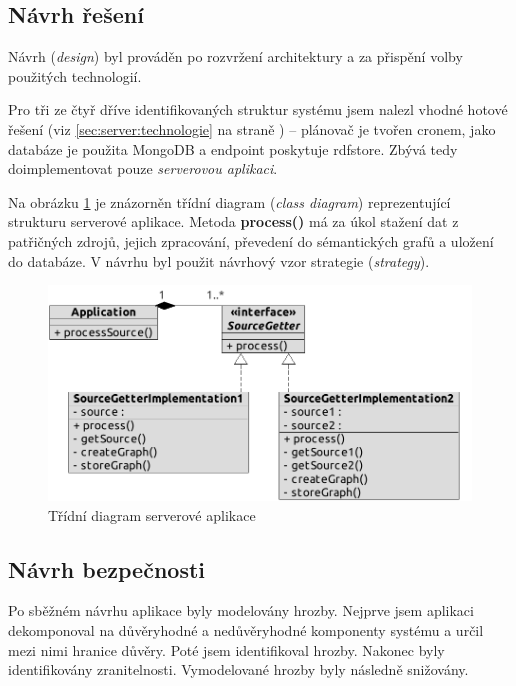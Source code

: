 \subsection{Návrh řešení}
Návrh (\textit{design}) byl prováděn po rozvržení architektury a za přispění volby použitých technologií.

Pro tři ze čtyř dříve identifikovaných struktur systému jsem nalezl vhodné hotové řešení (viz \ref{sec:server:technologie} na straně \pageref{sec:server:technologie}) -- plánovač je tvořen cronem, jako databáze je použita MongoDB a  endpoint poskytuje rdfstore. Zbývá tedy doimplementovat pouze \textit{serverovou aplikaci}.

Na obrázku \ref{fig:server:class} je znázorněn třídní diagram (\textit{class diagram}) reprezentující strukturu serverové aplikace. Metoda \textbf{process()} má za úkol stažení dat z patřičných zdrojů, jejich zpracování, převedení do sémantických grafů a uložení do databáze. V návrhu byl použit návrhový vzor strategie (\textit{strategy}).

\begin{figure}[h]
 \centering
 \includegraphics[width=11.47cm]{./figures/class-s.pdf}
 \caption{Třídní diagram serverové aplikace}
 \label{fig:server:class}
\end{figure}



\subsection{Návrh bezpečnosti}
Po sběžném návrhu aplikace byly modelovány hrozby. Nejprve jsem aplikaci dekomponoval na důvěryhodné a nedůvěryhodné komponenty systému a určil mezi nimi hranice důvěry. Poté jsem identifikoval hrozby. Nakonec byly identifikovány zranitelnosti. Vymodelované hrozby byly následně snižovány.

